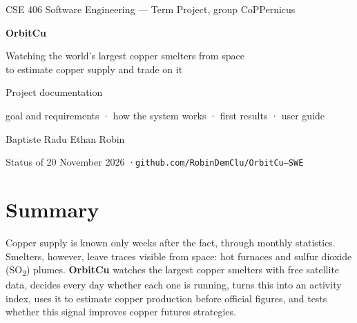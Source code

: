 \documentclass[10pt,a4paper]{article}
\newcommand{\SOtwo}{SO\textsubscript{2}}
\newcommand{\code}[1]{\texttt{\small #1}}
\begin{document}
\begin{titlepage}
\centering
\vspace*{3cm}
{\sffamily\color{copper}\large CSE 406 Software Engineering --- Term Project, group CoPPernicus\par}
\vspace{1.4cm}
{\sffamily\bfseries\color{ink}\fontsize{34}{40}\selectfont OrbitCu\par}
\vspace{0.5cm}
{\sffamily\Large\color{ink}Watching the world's largest copper smelters from space\\ to estimate copper supply and trade on it\par}
\vspace{1.4cm}
{\large Project documentation\par}
\vspace{0.2cm}
{\color{muted}goal and requirements · how the system works · first results · user guide\par}
\vfill
{\large Baptiste \quad Radu \quad Ethan \quad Robin\par}
\vspace{0.3cm}
{\color{muted}Status of 20 November 2026 \quad·\quad \code{github.com/RobinDemClu/OrbitCu---SWE}\par}
\vspace*{1cm}
\end{titlepage}

\section*{Summary}

Copper supply is known only weeks after the fact, through monthly statistics. Smelters, however, leave traces visible from space: hot furnaces and sulfur dioxide (\SOtwo) plumes. \textbf{OrbitCu} watches the largest copper smelters with free satellite data, decides every day whether each one is running, turns this into an activity index, uses it to estimate copper production before official figures, and tests whether this signal improves copper futures strategies.
\end{document}
